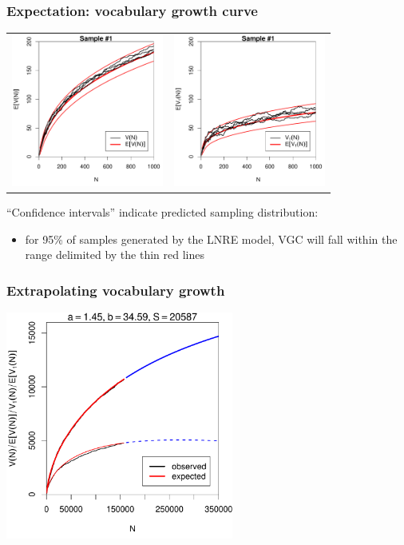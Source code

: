 \documentclass[handout,notes=show,t]{beamer} %
\begin{document}
\begin{frame}
  \frametitle{Expectation: vocabulary growth curve}

  \ungap[1]
  \begin{center}
    \begin{tabular}{c @{} c}
      \includegraphics[width=50mm]{img/05-samples-vgc-exp-vs-samples-conf} &
      \includegraphics[width=50mm]{img/05-samples-vgc-V1-exp-vs-samples-conf}
    \end{tabular}
  \end{center}

  ``Confidence intervals'' indicate predicted sampling distribution:%
  \begin{itemize}
  \item[\hand] for 95\% of samples generated by the LNRE model, VGC will fall within the range delimited by the thin red lines
  \end{itemize}
\end{frame}

\begin{frame}[c]
  \frametitle{Extrapolating vocabulary growth}
  
  \centering
  \includegraphics[width=7.5cm]{img/02-samples-ot-vgc-extrapolated}
\end{frame}
\end{document}
